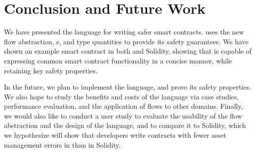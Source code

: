 \documentclass[dvipsnames,runningheads]{llncs}
\begin{document}
\section{Conclusion and Future Work}

We have presented the \langName language for writing safer smart contracts.
\langName uses the new flow abstraction, \assetTxt{}s, and type quantities to provide its safety guarantees.
We have shown an example smart contract in both \langName and Solidity, showing that \langName is capable of expressing common smart contract functionality in a concise manner, while retaining key safety properties.

In the future, we plan to implement the \langName language, and prove its safety properties.
We also hope to study the benefits and costs of the language via case studies, performance evaluation, and the application of flows to other domains.
Finally, we would also like to conduct a user study to evaluate the usability of the flow abstraction and the design of the language, and to compare it to Solidity, which we hypothesize will show that developers write contracts with fewer asset management errors in \langName than in Solidity.



\end{document}
